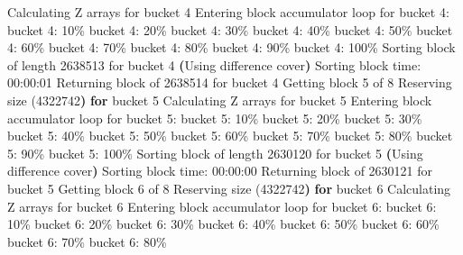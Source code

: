 \documentclass[
  letterpaper,
  DIV=11,
  numbers=noendperiod]{scrartcl}
\newenvironment{Shaded}{\begin{snugshade}}{\end{snugshade}}
\newcommand{\ControlFlowTok}[1]{\textcolor[rgb]{0.00,0.23,0.31}{\textbf{#1}}}
\newcommand{\ErrorTok}[1]{\textcolor[rgb]{0.68,0.00,0.00}{#1}}
\newcommand{\ExtensionTok}[1]{\textcolor[rgb]{0.00,0.23,0.31}{#1}}
\newcommand{\KeywordTok}[1]{\textcolor[rgb]{0.00,0.23,0.31}{\textbf{#1}}}
\newcommand{\NormalTok}[1]{\textcolor[rgb]{0.00,0.23,0.31}{#1}}
\begin{document}
\begin{Shaded}
\begin{Highlighting}[]
  \ExtensionTok{Calculating}\NormalTok{ Z arrays for bucket 4}
  \ExtensionTok{Entering}\NormalTok{ block accumulator loop for bucket 4:}
  \ExtensionTok{bucket}\NormalTok{ 4: 10\%}
  \ExtensionTok{bucket}\NormalTok{ 4: 20\%}
  \ExtensionTok{bucket}\NormalTok{ 4: 30\%}
  \ExtensionTok{bucket}\NormalTok{ 4: 40\%}
  \ExtensionTok{bucket}\NormalTok{ 4: 50\%}
  \ExtensionTok{bucket}\NormalTok{ 4: 60\%}
  \ExtensionTok{bucket}\NormalTok{ 4: 70\%}
  \ExtensionTok{bucket}\NormalTok{ 4: 80\%}
  \ExtensionTok{bucket}\NormalTok{ 4: 90\%}
  \ExtensionTok{bucket}\NormalTok{ 4: 100\%}
  \ExtensionTok{Sorting}\NormalTok{ block of length 2638513 for bucket 4}
  \KeywordTok{(}\ExtensionTok{Using}\NormalTok{ difference cover}\KeywordTok{)}
  \ExtensionTok{Sorting}\NormalTok{ block time: 00:00:01}
\ExtensionTok{Returning}\NormalTok{ block of 2638514 for bucket 4}
\ExtensionTok{Getting}\NormalTok{ block 5 of 8}
  \ExtensionTok{Reserving}\NormalTok{ size }\ErrorTok{(}\ExtensionTok{4322742}\KeywordTok{)} \ControlFlowTok{for}\NormalTok{ bucket }\ExtensionTok{5}
  \ExtensionTok{Calculating}\NormalTok{ Z arrays for bucket 5}
  \ExtensionTok{Entering}\NormalTok{ block accumulator loop for bucket 5:}
  \ExtensionTok{bucket}\NormalTok{ 5: 10\%}
  \ExtensionTok{bucket}\NormalTok{ 5: 20\%}
  \ExtensionTok{bucket}\NormalTok{ 5: 30\%}
  \ExtensionTok{bucket}\NormalTok{ 5: 40\%}
  \ExtensionTok{bucket}\NormalTok{ 5: 50\%}
  \ExtensionTok{bucket}\NormalTok{ 5: 60\%}
  \ExtensionTok{bucket}\NormalTok{ 5: 70\%}
  \ExtensionTok{bucket}\NormalTok{ 5: 80\%}
  \ExtensionTok{bucket}\NormalTok{ 5: 90\%}
  \ExtensionTok{bucket}\NormalTok{ 5: 100\%}
  \ExtensionTok{Sorting}\NormalTok{ block of length 2630120 for bucket 5}
  \KeywordTok{(}\ExtensionTok{Using}\NormalTok{ difference cover}\KeywordTok{)}
  \ExtensionTok{Sorting}\NormalTok{ block time: 00:00:00}
\ExtensionTok{Returning}\NormalTok{ block of 2630121 for bucket 5}
\ExtensionTok{Getting}\NormalTok{ block 6 of 8}
  \ExtensionTok{Reserving}\NormalTok{ size }\ErrorTok{(}\ExtensionTok{4322742}\KeywordTok{)} \ControlFlowTok{for}\NormalTok{ bucket }\ExtensionTok{6}
  \ExtensionTok{Calculating}\NormalTok{ Z arrays for bucket 6}
  \ExtensionTok{Entering}\NormalTok{ block accumulator loop for bucket 6:}
  \ExtensionTok{bucket}\NormalTok{ 6: 10\%}
  \ExtensionTok{bucket}\NormalTok{ 6: 20\%}
  \ExtensionTok{bucket}\NormalTok{ 6: 30\%}
  \ExtensionTok{bucket}\NormalTok{ 6: 40\%}
  \ExtensionTok{bucket}\NormalTok{ 6: 50\%}
  \ExtensionTok{bucket}\NormalTok{ 6: 60\%}
  \ExtensionTok{bucket}\NormalTok{ 6: 70\%}
  \ExtensionTok{bucket}\NormalTok{ 6: 80\%}

\end{Highlighting}
\end{Shaded}
\end{document}
